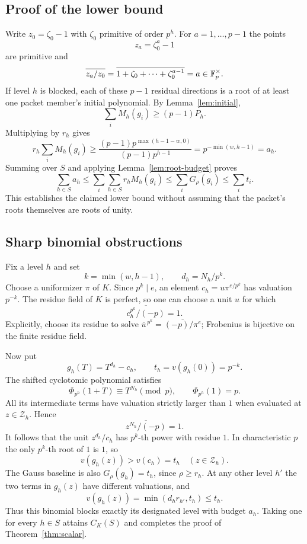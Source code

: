 \subsection{Proof of the lower bound}
Write $z_0=\zeta_0-1$ with $\zeta_0$ primitive of order $p^h$. For $a=1,\ldots,p-1$ the points
\[
z_a=\zeta_0^a-1
\]
are primitive and
\[
 \overline{z_a/z_0}
 =\overline{1+\zeta_0+\cdots+\zeta_0^{a-1}}
 =a\in\mathbb F_p^\times.
\]
If level $h$ is blocked, each of these $p-1$ residual directions is a root of at least one packet member's initial polynomial. By Lemma~\ref{lem:initial},
\[
 \sum_i M_h(g_i)\ge(p-1)P_h.
\]
Multiplying by $r_h$ gives
\[
 r_h\sum_i M_h(g_i)
 \ge\frac{(p-1)p^{\max(h-1-w,0)}}{(p-1)p^{h-1}}
 =p^{-\min(w,h-1)}=a_h.
\]
Summing over $S$ and applying Lemma~\ref{lem:root-budget} proves
\[
 \sum_{h\in S}a_h
 \le\sum_i\sum_{h\in S}r_hM_h(g_i)
 \le\sum_iG_\rho(g_i)
 \le\sum_i t_i.
\]
This establishes the claimed lower bound without assuming that the packet's roots themselves are roots of unity.

\subsection{Sharp binomial obstructions}
Fix a level $h$ and set
\[
 k=\min(w,h-1),\qquad d_h=N_h/p^k.
\]
Choose a uniformizer $\pi$ of $K$. Since $p^k\mid e$, an element
$c_h=u\pi^{e/p^k}$ has valuation $p^{-k}$. The residue field of $K$ is perfect, so one can choose a unit $u$ for which
\[
 \overline{c_h^{p^k}/(-p)}=1.
\]
Explicitly, choose its residue to solve
$\overline u^{\,p^k}=\overline{(-p)/\pi^e}$; Frobenius is bijective on the finite residue field.

Now put
\[
g_h(T)=T^{d_h}-c_h,\qquad t_h=v(g_h(0))=p^{-k}.
\]
The shifted cyclotomic polynomial satisfies
\[
 \Phi_{p^h}(1+T)\equiv T^{N_h}\pmod p,
 \qquad \Phi_{p^h}(1)=p.
\]
All its intermediate terms have valuation strictly larger than $1$ when evaluated at $z\in\mathcal Z_h$. Hence
\[
 \overline{z^{N_h}/(-p)}=1.
\]
It follows that the unit $z^{d_h}/c_h$ has $p^k$-th power with residue $1$. In characteristic $p$ the only $p^k$-th root of $1$ is $1$, so
\[
v(g_h(z))>v(c_h)=t_h
\quad(z\in\mathcal Z_h).
\]
The Gauss baseline is also $G_\rho(g_h)=t_h$, since $\rho\ge r_h$. At any other level $h'$ the two terms in $g_h(z)$ have different valuations, and
\[
v(g_h(z))=\min(d_hr_{h'},t_h)\le t_h.
\]
Thus this binomial blocks exactly its designated level with budget $a_h$. Taking one for every $h\in S$ attains $C_K(S)$ and completes the proof of Theorem~\ref{thm:scalar}.

